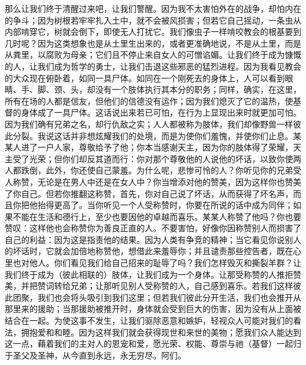 那么让我们终于清醒过来吧，让我们警醒。因为我不太害怕外在的战争，却怕内在的争斗；因为树根若牢牢扎入土中，就不会被风损害；但若它自己摇动，一条虫从内部啃穿它，树就会倒下，即使无人打扰它。我们像虫子一样啃咬教会的根基要到几时呢？因为这类想象也是从土里生出来的，或者更准确地说，不是从土里，而是从粪里，以腐败为母亲；它们且不停止来自女人的可憎谄媚。让我们终于成为慷慨的人，让我们成为哲学的勇士，让我们击退这些邪恶的猛烈进程。因为我看见教会的大众现在俯卧着，如同一具尸体。如同在一个刚死去的身体上，人可以看到眼睛、手、脚、颈、头，却没有一个肢体执行其本分的职务；同样，确实，在这里，所有在场的人都是信友，但他们的信德没有运作；因为我们熄灭了它的温热，使基督的身体成了一具尸体。这话说出来若已可怕，在行为上显现出来时就更加可怕。因为我们确有兄弟之名，却行仇敌之实；人人都被称为肢体，我们却像野兽一样彼此分裂。我说这话并非想炫耀我们的处境，而是为使你们羞愧，并使你们止息。某某人进了一户人家，尊敬给予了他；你本当感谢天主，因为你的肢体得了荣耀，天主受了光荣；但你们却反其道而行：你对那个尊敬他的人说他的坏话，以致你使两人都跌倒，此外，你还使自己蒙羞。为什么呢，悲惨可怜的人？你听见你的兄弟受人称赞，无论是在男人中还是在女人中？你当增添对他的赞美，因为这样你也赞美了你自己。但若你推翻这称赞，首先，你对自己说了坏话，从而获得了坏名声，而且你把他抬得更高了。当你听见一个人受称赞时，你要在所说的话中成为同伴；如果不能在生活和德行上，至少也要因他的卓越而喜乐。某某人称赞了他吗？你也要赞叹：这样他也会称赞你为善良正直的人。不要害怕，好像你因称赞别人而损害了自己的利益：因为这是指责他的结果。因为人类有争竞的精神；当它看见你说别人的坏话时，它就会加倍地称赞他，想借此来羞辱你；并且谴责那些控告者，既在心里也对他人。你们看见我们给自己招来的耻辱了吗？我们怎样毁灭和撕裂羊群？让我们终于成为（彼此相联的）肢体，让我们成为一个身体。让那受称赞的人推拒赞美，并把赞词转给兄弟；让那听见别人受称赞的人，自己感到喜乐。若我们这样彼此团聚，我们也会将头吸引到我们这里；但若我们彼此分开生活，我们也会推开从那里来的援助；当那援助被推开时，身体就会受到巨大的伤害，因为没有从上面被结合在一起。为使这事不发生，让我们驱除恶意和嫉妒，轻视众人可能对我们的看法，拥抱爱和和睦。因为这样我们就会获得现世和来世的美物；愿我们众人能达到这一点，藉着我们的主对人的恩宠和爱，愿光荣、权能、尊崇与祂（基督）一起归于圣父及圣神，从今直到永远，永无穷尽。阿们。\par



